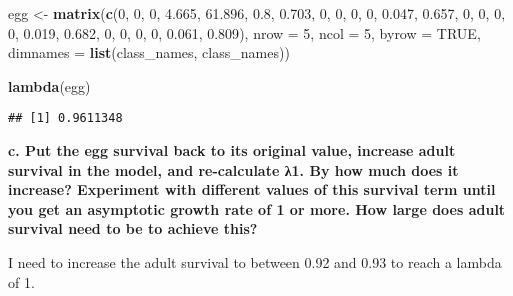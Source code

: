 \documentclass[]{article}
\newenvironment{Shaded}{\begin{snugshade}}{\end{snugshade}}
\newcommand{\KeywordTok}[1]{\textcolor[rgb]{0.13,0.29,0.53}{\textbf{#1}}}
\newcommand{\DataTypeTok}[1]{\textcolor[rgb]{0.13,0.29,0.53}{#1}}
\newcommand{\DecValTok}[1]{\textcolor[rgb]{0.00,0.00,0.81}{#1}}
\newcommand{\FloatTok}[1]{\textcolor[rgb]{0.00,0.00,0.81}{#1}}
\newcommand{\StringTok}[1]{\textcolor[rgb]{0.31,0.60,0.02}{#1}}
\newcommand{\OtherTok}[1]{\textcolor[rgb]{0.56,0.35,0.01}{#1}}
\newcommand{\NormalTok}[1]{#1}
\begin{document}
\begin{Shaded}
\begin{Highlighting}[]
\NormalTok{egg <-}\StringTok{ }\KeywordTok{matrix}\NormalTok{(}\KeywordTok{c}\NormalTok{(}\DecValTok{0}\NormalTok{, }\DecValTok{0}\NormalTok{, }\DecValTok{0}\NormalTok{, }\FloatTok{4.665}\NormalTok{, }\FloatTok{61.896}\NormalTok{,}
                \FloatTok{0.8}\NormalTok{, }\FloatTok{0.703}\NormalTok{, }\DecValTok{0}\NormalTok{, }\DecValTok{0}\NormalTok{, }\DecValTok{0}\NormalTok{,}
                \DecValTok{0}\NormalTok{, }\FloatTok{0.047}\NormalTok{, }\FloatTok{0.657}\NormalTok{, }\DecValTok{0}\NormalTok{, }\DecValTok{0}\NormalTok{,}
                \DecValTok{0}\NormalTok{, }\DecValTok{0}\NormalTok{, }\FloatTok{0.019}\NormalTok{, }\FloatTok{0.682}\NormalTok{, }\DecValTok{0}\NormalTok{,}
                \DecValTok{0}\NormalTok{, }\DecValTok{0}\NormalTok{, }\DecValTok{0}\NormalTok{, }\FloatTok{0.061}\NormalTok{, }\FloatTok{0.809}\NormalTok{),}
\DataTypeTok{nrow =} \DecValTok{5}\NormalTok{, }\DataTypeTok{ncol =} \DecValTok{5}\NormalTok{, }\DataTypeTok{byrow =} \OtherTok{TRUE}\NormalTok{, }\DataTypeTok{dimnames =} \KeywordTok{list}\NormalTok{(class_names, class_names))}

\KeywordTok{lambda}\NormalTok{(egg)}
\end{Highlighting}
\end{Shaded}

\begin{verbatim}
## [1] 0.9611348
\end{verbatim}

\textbf{c. Put the egg survival back to its original value, increase
adult survival in the model, and re-calculate λ1. By how much does it
increase? Experiment with different values of this survival term until
you get an asymptotic growth rate of 1 or more. How large does adult
survival need to be to achieve this? }

I need to increase the adult survival to between 0.92 and 0.93 to reach
a lambda of 1.
\end{document}
